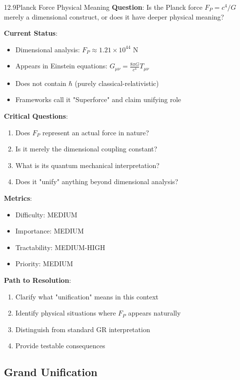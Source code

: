 \begin{openproblem}{12.9}{Planck Force Physical Meaning}
\textbf{Question}: Is the Planck force $F_P = c^4/G$ merely a dimensional construct, or does it have deeper physical meaning?

\textbf{Current Status}:
\begin{itemize}
    \item Dimensional analysis: $F_P \approx 1.21 \times 10^{44}$ N
    \item Appears in Einstein equations: $G_{\mu\nu} = \frac{8\pi G}{c^4} T_{\mu\nu}$
    \item Does not contain $\hbar$ (purely classical-relativistic)
    \item Frameworks call it "Superforce" and claim unifying role
\end{itemize}

\textbf{Critical Questions}:
\begin{enumerate}
    \item Does $F_P$ represent an actual force in nature?
    \item Is it merely the dimensional coupling constant?
    \item What is its quantum mechanical interpretation?
    \item Does it "unify" anything beyond dimensional analysis?
\end{enumerate}

\textbf{Metrics}:
\begin{itemize}
    \item Difficulty: MEDIUM
    \item Importance: MEDIUM
    \item Tractability: MEDIUM-HIGH
    \item Priority: MEDIUM
\end{itemize}

\textbf{Path to Resolution}:
\begin{enumerate}
    \item Clarify what "unification" means in this context
    \item Identify physical situations where $F_P$ appears naturally
    \item Distinguish from standard GR interpretation
    \item Provide testable consequences
\end{enumerate}
\end{openproblem}

\subsection{Grand Unification}

